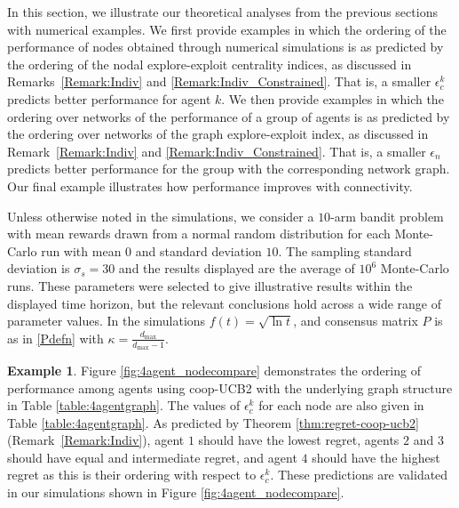 \documentclass[final,5p,times,twocolumn]{elsarticle}
\theoremstyle{definition}
\newtheorem{example}{Example}
\begin{document}
In this section, we illustrate our theoretical analyses from the previous sections 
with numerical examples. We first  provide examples in which the ordering of the performance of nodes obtained through numerical simulations is as predicted by the ordering of the nodal explore-exploit centrality indices, as discussed in Remarks~\ref{Remark:Indiv} and \ref{Remark:Indiv_Constrained}. That is, a smaller $\epsilon_c^k$ predicts better performance for agent $k$.  We then provide examples in which the ordering over networks of the performance of a group of agents is as predicted by the ordering over networks of the graph explore-exploit index, as discussed in Remark~\ref{Remark:Indiv} and \ref{Remark:Indiv_Constrained}. That is, a smaller $\epsilon_n$ predicts better performance for the group with the corresponding network graph. Our final example illustrates how performance improves with connectivity.

Unless otherwise noted in the simulations, we consider a $10$-arm bandit problem with mean rewards drawn from a normal random distribution for each Monte-Carlo run with mean $0$ and standard deviation $10$. The sampling standard deviation  is $\sigma_s = 30$ and the results displayed are the average of $10^6$ Monte-Carlo runs.  These parameters were selected to give illustrative results within the displayed time horizon, but the relevant conclusions hold across a wide range of parameter values. In the simulations $f(t)=\sqrt{\ln t}$, and consensus matrix $P$ is as in \eqref{Pdefn} with $\kappa = \frac{d_{\text{max}}}{d_{\text{max}}-1}$.



\begin{example}\label{ex:4agent_nodecompare}
	Figure \ref{fig:4agent_nodecompare} demonstrates the ordering of performance among agents using coop-UCB2 with the underlying graph structure in Table \ref{table:4agentgraph}.  The values of $\epsilon_c^k$ for each node are also given in Table \ref{table:4agentgraph}. As predicted by Theorem \ref{thm:regret-coop-ucb2} (Remark~\ref{Remark:Indiv}), agent $1$ should have the lowest regret, agents $2$ and $3$ should have equal and intermediate regret, and agent $4$ should have the highest regret as this is their ordering with respect to $\epsilon_c^k$. These predictions are validated in our simulations shown in Figure \ref{fig:4agent_nodecompare}.
\end{example}
\end{document}
